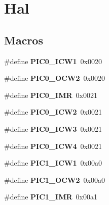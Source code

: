\hypertarget{group__hal}{}\section{Hal}
\label{group__hal}
\subsection*{Macros}
\begin{DoxyCompactItemize}
\item 
\hypertarget{group__hal_ga2848d27ae631e5ea166a047b10968eff}{}\#define {\bfseries P\+I\+C0\+\_\+\+I\+C\+W1}~0x0020\label{group__hal_ga2848d27ae631e5ea166a047b10968eff}

\item 
\hypertarget{group__hal_gad634cb61f109eb41b718c8002dc1415c}{}\#define {\bfseries P\+I\+C0\+\_\+\+O\+C\+W2}~0x0020\label{group__hal_gad634cb61f109eb41b718c8002dc1415c}

\item 
\hypertarget{group__hal_gab78c32730c3c70d2d478f24a7c0735f4}{}\#define {\bfseries P\+I\+C0\+\_\+\+I\+M\+R}~0x0021\label{group__hal_gab78c32730c3c70d2d478f24a7c0735f4}

\item 
\hypertarget{group__hal_ga9878464c631c46a1c2aaab9e5912c790}{}\#define {\bfseries P\+I\+C0\+\_\+\+I\+C\+W2}~0x0021\label{group__hal_ga9878464c631c46a1c2aaab9e5912c790}

\item 
\hypertarget{group__hal_ga85a058cafc12a4d99dba78a17595adeb}{}\#define {\bfseries P\+I\+C0\+\_\+\+I\+C\+W3}~0x0021\label{group__hal_ga85a058cafc12a4d99dba78a17595adeb}

\item 
\hypertarget{group__hal_gadfbedb8dab608ce26852e3f436b3b2d7}{}\#define {\bfseries P\+I\+C0\+\_\+\+I\+C\+W4}~0x0021\label{group__hal_gadfbedb8dab608ce26852e3f436b3b2d7}

\item 
\hypertarget{group__hal_gab38487cc1695aff0e2c8ff9d8098ee7f}{}\#define {\bfseries P\+I\+C1\+\_\+\+I\+C\+W1}~0x00a0\label{group__hal_gab38487cc1695aff0e2c8ff9d8098ee7f}

\item 
\hypertarget{group__hal_ga13c1baed1a4823c4f568e25b062310cd}{}\#define {\bfseries P\+I\+C1\+\_\+\+O\+C\+W2}~0x00a0\label{group__hal_ga13c1baed1a4823c4f568e25b062310cd}

\item 
\hypertarget{group__hal_gadfb8ad9cdb4b01794bb0d7c946873b29}{}\#define {\bfseries P\+I\+C1\+\_\+\+I\+M\+R}~0x00a1\label{group__hal_gadfb8ad9cdb4b01794bb0d7c946873b29}


\end{DoxyCompactItemize}
